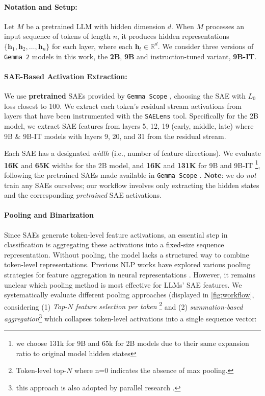 \paragraph{Notation and Setup:}
Let $M$ be a pretrained LLM with hidden dimension $d$. When $M$ processes an input sequence of tokens of length $n$, it produces hidden representations $\{\mathbf{h}_1, \mathbf{h}_2, \ldots, \mathbf{h}_n\}$ for each layer, where each $\mathbf{h}_t \in \mathbb{R}^d$. We consider three versions of \texttt{Gemma 2} models \cite{gemmateam2024gemma2improvingopen} in this work, the \textbf{2B},  \textbf{9B} and instruction-tuned variant, \textbf{9B-IT}.

\paragraph{SAE-Based Activation Extraction:}
We use \textbf{pretrained} SAEs provided by \texttt{Gemma Scope} \cite{lieberum2024gemma}, choosing the SAE with $L_0$ loss closest to 100. We extract each token’s residual stream activations from layers that have been instrumented with the \texttt{SAELens} \cite{bloom2024saetrainingcodebase} tool. Specifically for the 2B model, we extract SAE features from layers 5, 12, 19 (early, middle, late) where 9B \& 9B-IT models with layers 9, 20, and 31 from the residual stream.

Each SAE has a designated \emph{width} (i.e., number of feature directions). We evaluate \textbf{16K} and \textbf{65K} widths for the 2B model, and \textbf{16K} and \textbf{131K} for 9B and 9B-IT \footnote{we choose 131k for 9B and 65k for 2B models due to their same expansion ratio to original model hidden states}, following the pretrained SAEs made available in \texttt{Gemma Scope} \cite{lieberum2024gemma}. \textbf{Note}: we do \textit{not} train any SAEs ourselves; our workflow involves only extracting the hidden states and the corresponding \emph{pretrained} SAE activations.

\paragraph{Pooling and Binarization}
Since SAEs generate token-level feature activations, an essential step in classification is aggregating these activations into a fixed-size sequence representation. Without pooling, the model lacks a structured way to combine token-level representations. Previous NLP works have explored various pooling strategies for feature aggregation in neural representations \cite{shen2018baseline}. However, it remains unclear which pooling method is most effective for LLMs' SAE features. We systematically evaluate different pooling approaches (displayed in \ref{fig:workflow}, considering (1) \emph{Top-$N$ feature selection per token} \footnote{Token-level top-$N$ where n=0 indicates the absence of max pooling.} and (2) \emph{summation-based aggregation}\footnote{this approach is also adopted by parallel research \cite{brinkmann2025large}.} which collapses token-level activations into a single sequence vector:

